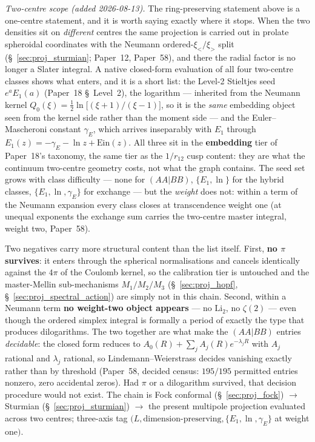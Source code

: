 \documentclass[11pt]{article}
\begin{document}
\emph{Two-centre scope (added 2026-08-13).}  The ring-preserving
statement above is a one-centre statement, and it is worth saying
exactly where it stops.  When the two densities sit on
\emph{different} centres the same projection is carried out in prolate
spheroidal coordinates with the Neumann ordered-$\xi_</\xi_>$ split
(\S~\ref{sec:proj_sturmian}; Paper~12, Paper~58), and there the radial
factor is no longer a Slater integral.  A native closed-form
evaluation of all four two-centre classes shows what enters, and it is
a short list: the Level-2 Stieltjes seed $e^a E_1(a)$ (Paper~18
\S~Level~2), the logarithm --- inherited from the Neumann kernel
$Q_0(\xi) = \tfrac12 \ln\!\big[(\xi{+}1)/(\xi{-}1)\big]$, so it is the
\emph{same} embedding object seen from the kernel side rather than the
moment side --- and the Euler--Mascheroni constant $\gamma_E$, which
arrives inseparably with $E_1$ through
$E_1(z) = -\gamma_E - \ln z + \mathrm{Ein}(z)$.  All three sit in the
\textbf{embedding} tier of Paper~18's taxonomy, the same tier as the
$1/r_{12}$ cusp content: they are what the continuum two-centre
geometry costs, not what the graph contains.  The seed set grows with
class difficulty --- none for $(AA|BB)$, $\{E_1, \ln\}$ for the hybrid
classes, $\{E_1, \ln, \gamma_E\}$ for exchange --- but the
\emph{weight} does not: within a term of the Neumann expansion every
class closes at transcendence weight one (at unequal exponents the
exchange sum carries the two-centre master integral, weight two,
Paper~58).

Two negatives carry more structural content than the list itself.
First, \textbf{no $\pi$ survives}: it enters through the spherical
normalisations and cancels identically against the $4\pi$ of the
Coulomb kernel, so the calibration tier is untouched and the
master-Mellin sub-mechanisms $M_1/M_2/M_3$ (\S~\ref{sec:proj_hopf},
\S~\ref{sec:proj_spectral_action}) are simply not in this chain.
Second, within a Neumann term \textbf{no weight-two object appears} --- no $\mathrm{Li}_2$,
no $\zeta(2)$ --- even though the ordered simplex integral is formally
a period of exactly the type that produces dilogarithms.  The two
together are what make the $(AA|BB)$ entries \emph{decidable}: the
closed form reduces to $A_0(R) + \sum_j A_j(R) e^{-\lambda_j R}$ with
$A_j$ rational and $\lambda_j$ rational, so Lindemann--Weierstrass
decides vanishing exactly rather than by threshold (Paper~58, decided
census: $195/195$ permitted entries nonzero, zero accidental
zeros).  Had $\pi$ or a
dilogarithm survived, that decision procedure would not exist.  The
chain is Fock conformal (\S~\ref{sec:proj_fock}) $\to$ Sturmian
(\S~\ref{sec:proj_sturmian}) $\to$ the present multipole projection
evaluated across two centres; three-axis tag $(L, \text{dimension-preserving},
\{E_1, \ln, \gamma_E\}$ at weight one$)$.
\end{document}
